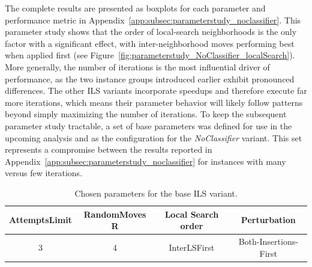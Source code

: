 The complete results are presented as boxplots for each parameter and performance metric in
Appendix~\ref{app:subsec:parameterstudy_noclassifier}. This parameter study shows that the order of local-search neighborhoods
is the only factor with a significant effect, with inter-neighborhood moves performing best when applied first
(see Figure~\ref{fig:parameterstudy_NoClassifier_localSearch}). More generally, the number of iterations is the most
influential driver of performance, as the two instance groups introduced earlier exhibit pronounced differences.
The other \gls{ILS} variants incorporate speedups and therefore execute far more iterations, which means their parameter behavior
will likely follow patterns beyond simply maximizing the number of iterations. To keep the subsequent parameter study tractable,
a set of base parameters was defined for use in the upcoming analysis and as the configuration for the \textit{NoClassifier} variant.
This set represents a compromise between the results reported in Appendix~\ref{app:subsec:parameterstudy_noclassifier} for instances
with many versus few iterations.
\begin{table}[ht]
	\centering
	\begin{tabular}{@{}cccc@{}}
		\toprule
		AttemptsLimit & RandomMoves        R & Local Search order & Perturbation          \\
		\midrule
		3             & 4                    & InterLSFirst       & Both-Insertions-First \\
		\bottomrule
	\end{tabular}
	\caption{Chosen parameters for the base ILS variant.}
	\label{tab:parameters_final_noclassifier}
\end{table}

